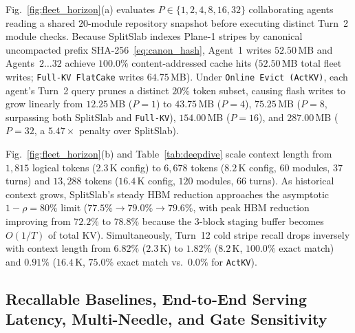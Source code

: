 \documentclass[final,5p,times,twocolumn]{elsarticle}
\theoremstyle{definition}
\theoremstyle{remark}
\newcommand{\SplitSlab}{\textup{\textsc{SplitSlab}}}
\def\SplitSlab{SplitSlab}%
\begin{document}
Fig.~\ref{fig:fleet_horizon}(a) evaluates $P \in \{1, 2, 4, 8, 16, 32\}$ collaborating agents reading a shared $20$-module repository snapshot before executing distinct Turn~2 module checks. Because \SplitSlab{} indexes Plane-1 stripes by canonical uncompacted prefix SHA-256~\eqref{eq:canon_hash}, Agent~1 writes $52.50$\,MB and Agents~$2\dots 32$ achieve $100.0\%$ content-addressed cache hits ($52.50$\,MB total fleet writes; \texttt{Full-KV FlatCake} writes $64.75$\,MB). Under \texttt{Online Evict (ActKV)}, each agent's Turn~2 query prunes a distinct $20\%$ token subset, causing flash writes to grow linearly from $12.25$\,MB ($P=1$) to $43.75$\,MB ($P=4$), $75.25$\,MB ($P=8$, surpassing both \SplitSlab{} and \texttt{Full-KV}), $154.00$\,MB ($P=16$), and $287.00$\,MB ($P=32$, a $5.47\times$ penalty over \SplitSlab{}).

Fig.~\ref{fig:fleet_horizon}(b) and Table~\ref{tab:deepdive} scale context length from $1{,}815$ logical tokens ($2.3$\,K config) to $6{,}678$ tokens ($8.2$\,K config, $60$ modules, $37$ turns) and $13{,}288$ tokens ($16.4$\,K config, $120$ modules, $66$ turns). As historical context grows, \SplitSlab{}'s steady HBM reduction approaches the asymptotic $1-\rho = 80\%$ limit ($77.5\% \to 79.0\% \to 79.6\%$, with peak HBM reduction improving from $72.2\%$ to $78.8\%$ because the $3$-block staging buffer becomes $O(1/T)$ of total KV). Simultaneously, Turn~12 cold stripe recall drops inversely with context length from $6.82\%$ ($2.3$\,K) to $1.82\%$ ($8.2$\,K, $100.0\%$ exact match) and $0.91\%$ ($16.4$\,K, $75.0\%$ exact match vs.\ $0.0\%$ for \texttt{ActKV}).

\subsection{Recallable Baselines, End-to-End Serving Latency, Multi-Needle, and Gate Sensitivity}\label{subsec:revision_eval}
\end{document}
